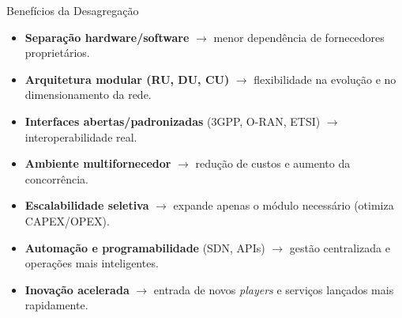 \begin{frame}{Benefícios da Desagregação}
\small
\begin{itemize}
  \item \textbf{Separação hardware/software} $\rightarrow$ menor dependência de fornecedores proprietários.
  \item \textbf{Arquitetura modular (RU, DU, CU)} $\rightarrow$ flexibilidade na evolução e no dimensionamento da rede.
  \item \textbf{Interfaces abertas/padronizadas} (3GPP, O-RAN, ETSI) $\rightarrow$ interoperabilidade real.
  \item \textbf{Ambiente multifornecedor} $\rightarrow$ redução de custos e aumento da concorrência.
  \item \textbf{Escalabilidade seletiva} $\rightarrow$ expande apenas o módulo necessário (otimiza CAPEX/OPEX).
  \item \textbf{Automação e programabilidade} (SDN, APIs) $\rightarrow$ gestão centralizada e operações mais inteligentes.
  \item \textbf{Inovação acelerada} $\rightarrow$ entrada de novos \textit{players} e serviços lançados mais rapidamente.
\end{itemize}
\end{frame}
